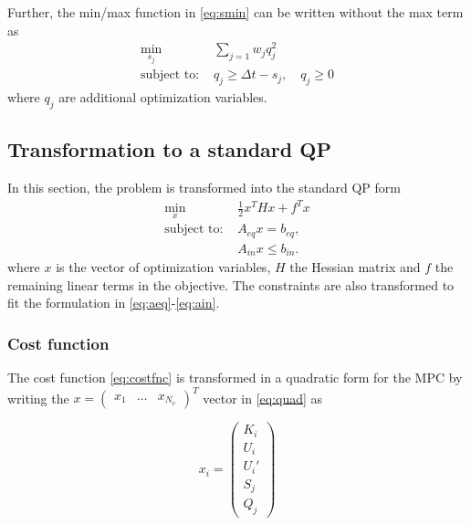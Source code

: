 \documentclass[letterpaper,10pt,conference]{ieeeconf}
\begin{document}
Further, the min/max function in \eqref{eq:smin} can be written without the max term as
\begin{subequations}\label{qdef}
\begin{align}\label{eq:qmin}
\min_{s_j}\;  &\sum_{j=1}  w_{j} q_j^2\\
\text{subject to: } & q_j \geq \Delta t - s_j, \quad q_j \geq 0
\end{align}
\end{subequations}
where $q_j$ are additional optimization variables.
\subsection{Transformation to a standard QP}
In this section, the problem is transformed into the standard QP form
\begin{subequations} \label{stform}
\begin{align}\label{eq:quad}
\min_{x}\; &\frac{1}{2}x^THx+f^Tx\\
\text{subject to: }
&A_{eq}x =b_{eq},\label{eq:aeq}\\
&A_{in}x \leq b_{in}.\label{eq:ain}
\end{align}
\end{subequations}
where $x$ is the vector of optimization variables, $H$ the Hessian matrix and $f$ the remaining linear terms in the objective. The constraints are also transformed to fit the formulation in \eqref{eq:aeq}-\eqref{eq:ain}.
\subsubsection{Cost function}
The cost function \eqref{eq:costfnc} is transformed in a quadratic form for the MPC by writing the $x=\begin{pmatrix}x_1&\dots&x_{N_v}  \end{pmatrix}^T$ vector in \eqref{eq:quad} as


\begin{equation}
x_i=\begin{pmatrix}
K_i \\ U_i\\ U_i' \\ S_j \\ Q_j
\end{pmatrix}
\end{equation}
\end{document}
